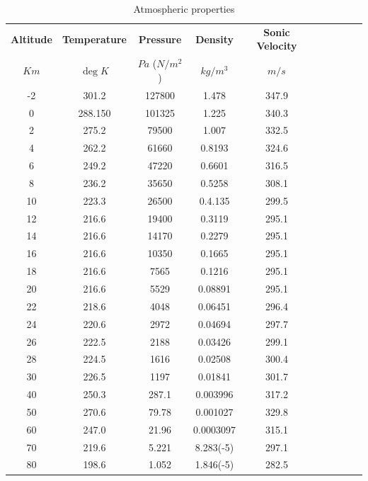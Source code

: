 \documentclass[11pt,openany,twoside]{book}
\numberwithin{equation}{section}		%
\begin{document}
\begin{table}[h]  %
\begin{tabular}{|c|c|c|c|c|c|c|c|c|c|} \hline
{\bf Altitude } & {\bf Temperature}  & {\bf Pressure} & {\bf Density} & {\bf Sonic Velocity} \\
$Km$            & $\deg K$           & $Pa$ ($N/m^2$)        & $kg/m^3$      & $m/s$ \\ \hline
  -2 & 301.2 & 127800 & 1.478 & 347.9 \\ \hline
   0 & 288.150 & 101325 & 1.225 & 340.3 \\ \hline
   2 & 275.2 & 79500 & 1.007 & 332.5 \\ \hline
   4 & 262.2 & 61660 & 0.8193 & 324.6 \\ \hline
   6 & 249.2 & 47220 & 0.6601 & 316.5 \\ \hline
   8 & 236.2 & 35650 & 0.5258 & 308.1 \\ \hline
  10 & 223.3 & 26500 & 0.4.135 & 299.5 \\ \hline
  12 & 216.6 & 19400 & 0.3119 & 295.1 \\ \hline
  14 & 216.6 & 14170 & 0.2279 & 295.1 \\ \hline
  16 & 216.6 & 10350 & 0.1665 & 295.1 \\ \hline
  18 & 216.6 & 7565 & 0.1216 & 295.1 \\ \hline
  20 & 216.6 & 5529 & 0.08891 & 295.1 \\ \hline
  22 & 218.6 & 4048 & 0.06451 & 296.4 \\ \hline
  24 & 220.6 & 2972 & 0.04694 & 297.7 \\ \hline
  26 & 222.5 & 2188 & 0.03426 & 299.1 \\ \hline
  28 & 224.5 & 1616 & 0.02508 & 300.4 \\ \hline
  30 & 226.5 & 1197 & 0.01841 & 301.7 \\ \hline
  40 & 250.3 & 287.1 & 0.003996 & 317.2 \\ \hline
  50 & 270.6 & 79.78 & 0.001027 & 329.8 \\ \hline
  60 & 247.0 & 21.96 & 0.0003097 & 315.1 \\ \hline
  70 & 219.6 & 5.221 & 8.283(-5) & 297.1 \\ \hline
  80 & 198.6 & 1.052 & 1.846(-5) & 282.5 \\ \hline
\end{tabular}
\caption{Atmospheric properties} \label{table:atmos}
\end{table}
\end{document}
